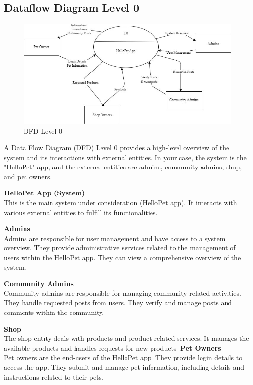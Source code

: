 
\subsection{Dataflow Diagram Level 0}
\begin{figure}[h]
    \centering
    \includegraphics[width= 5in ]{img/dfd_0.jpg}
    \caption[DFD Level 0]{DFD Level 0}
    \label{fig:dfd-level0}
\end{figure}

\justify
A Data Flow Diagram (DFD) Level 0 provides a high-level overview of the system and its interactions with external entities. In your case, the system is the "HelloPet" app, and the external entities are admins, community admins, shop, and pet owners.

    \noindent\textbf{HelloPet App (System)}\\
        This is the main system under consideration (HelloPet app).
        It interacts with various external entities to fulfill its functionalities.

    \noindent\textbf{Admins}\\
        Admins are responsible for user management and have access to a system overview.
        They provide administrative services related to the management of users within the HelloPet app.
        They can view a comprehensive overview of the system.

    \noindent\textbf{Community Admins}\\
        Community admins are responsible for managing community-related activities.
        They handle requested posts from users.
        They verify and manage posts and comments within the community.

        \noindent\textbf{Shop}\\
        The shop entity deals with products and product-related services.
        It manages the available products and handles requests for new products.
\newpage
        \noindent\textbf{Pet Owners}\\
        Pet owners are the end-users of the HelloPet app.
        They provide login details to access the app.
        They submit and manage pet information, including details and instructions related to their pets.

